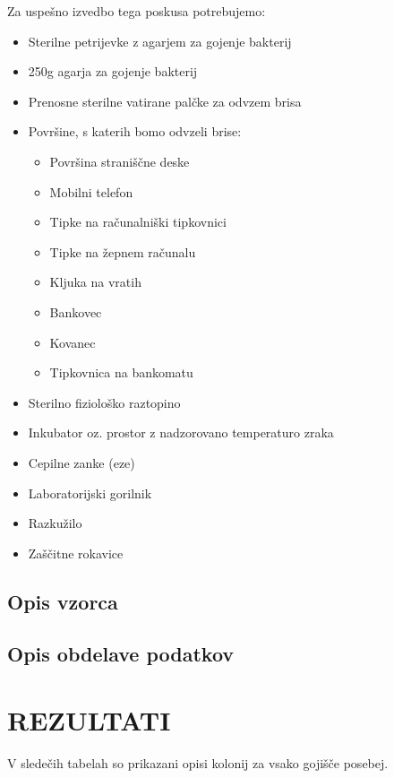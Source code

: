 \documentclass[12pt, a4paper, oneside]{report}
\begin{document}
Za uspešno izvedbo tega poskusa potrebujemo:
\begin{itemize}
  \item Sterilne petrijevke z agarjem za gojenje bakterij
  \item 250g agarja za gojenje bakterij
  \item Prenosne sterilne vatirane palčke za odvzem brisa
  \item Površine, s katerih bomo odvzeli brise:
  \begin{itemize}
    \item Površina straniščne deske
    \item Mobilni telefon
    \item Tipke na računalniški tipkovnici
    \item Tipke na žepnem računalu
    \item Kljuka na vratih
    \item Bankovec
    \item Kovanec
    \item Tipkovnica na bankomatu
  \end{itemize}
  \item Sterilno fiziološko raztopino
  \item Inkubator oz. prostor z nadzorovano temperaturo zraka
  \item Cepilne zanke (eze)
  \item Laboratorijski gorilnik
  \item Razkužilo
  \item Zaščitne rokavice

\end{itemize}

\subsection{Opis vzorca}

\subsection{Opis obdelave podatkov}

\section{REZULTATI}

V sledečih tabelah so prikazani opisi kolonij za vsako gojišče posebej.
\end{document}

